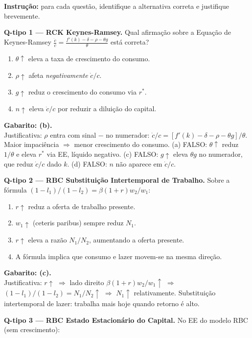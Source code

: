 \documentclass[12pt, a4paper]{article}
\begin{document}
\textbf{Instrução:} para cada questão, identifique a alternativa correta e justifique brevemente.

\medskip
\textbf{Q-tipo 1 --- RCK Keynes-Ramsey.} Qual afirmação sobre a Equação de Keynes-Ramsey $\frac{\dot{c}}{c} = \frac{f'(k)-\delta-\rho-\theta g}{\theta}$ está correta?

\begin{enumerate}[label=(\alph*)]
\item $\theta\uparrow$ eleva a taxa de crescimento do consumo.
\item $\rho\uparrow$ afeta \emph{negativamente} $\dot{c}/c$.
\item $g\uparrow$ reduz o crescimento do consumo via $r^*$.
\item $n\uparrow$ eleva $\dot{c}/c$ por reduzir a diluição do capital.
\end{enumerate}

\textbf{Gabarito: (b).}\\
Justificativa: $\rho$ entra com sinal $-$ no numerador: $\dot{c}/c = [f'(k)-\delta-\rho-\theta g]/\theta$. Maior impaciência $\Rightarrow$ menor crescimento do consumo. (a) FALSO: $\theta\uparrow$ reduz $1/\theta$ e eleva $r^*$ via EE, líquido negativo. (c) FALSO: $g\uparrow$ eleva $\theta g$ no numerador, que reduz $\dot{c}/c$ dado $k$. (d) FALSO: $n$ não aparece em $\dot{c}/c$.

\medskip
\textbf{Q-tipo 2 --- RBC Substituição Intertemporal de Trabalho.} Sobre a fórmula $(1-l_1)/(1-l_2) = \beta(1+r)w_2/w_1$:

\begin{enumerate}[label=(\alph*)]
\item $r\uparrow$ reduz a oferta de trabalho presente.
\item $w_1\uparrow$ (ceteris paribus) sempre reduz $N_1$.
\item $r\uparrow$ eleva a razão $N_1/N_2$, aumentando a oferta presente.
\item A fórmula implica que consumo e lazer movem-se na mesma direção.
\end{enumerate}

\textbf{Gabarito: (c).}\\
Justificativa: $r\uparrow$ $\Rightarrow$ lado direito $\beta(1+r)w_2/w_1\uparrow$ $\Rightarrow$ $(1-l_1)/(1-l_2) = N_1/N_2\uparrow$ $\Rightarrow$ $N_1\uparrow$ relativamente. Substituição intertemporal de lazer: trabalha mais hoje quando retorno é alto.

\medskip
\textbf{Q-tipo 3 --- RBC Estado Estacionário do Capital.} No EE do modelo RBC (sem crescimento):
\end{document}
